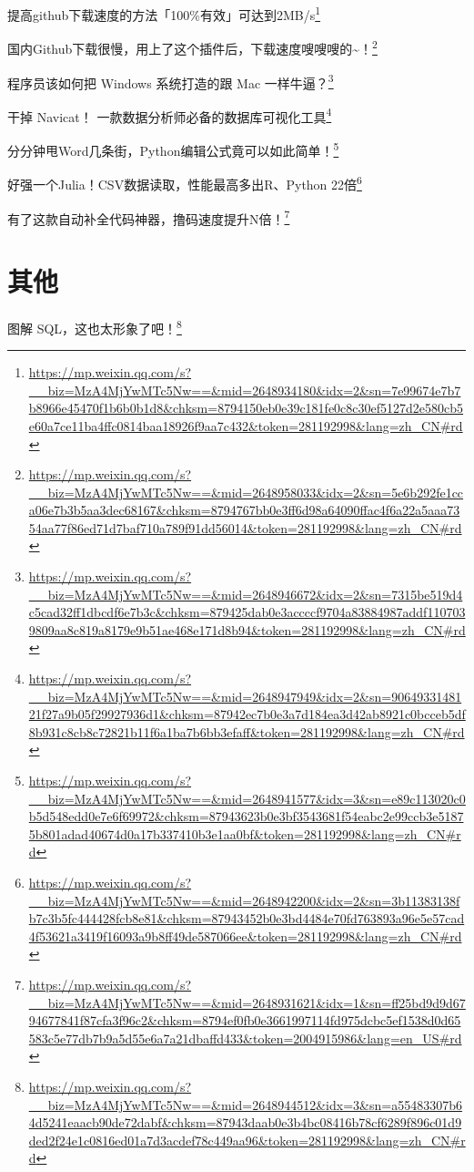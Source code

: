 \documentclass[]{ctexbook}
\renewcommand{\href}[2]{#2\footnote{\url{#1}}}
\begin{document}
\href{https://mp.weixin.qq.com/s?__biz=MzA4MjYwMTc5Nw==\&mid=2648934180\&idx=2\&sn=7e99674e7b7b8966e45470f1b6b0b1d8\&chksm=8794150eb0e39c181fe0c8c30ef5127d2e580cb5e60a7ce11ba4ffc0814baa18926f9aa7c432\&token=281192998\&lang=zh_CN\#rd}{提高github下载速度的方法「100\%有效」可达到2MB/s}

\href{https://mp.weixin.qq.com/s?__biz=MzA4MjYwMTc5Nw==\&mid=2648958033\&idx=2\&sn=5e6b292fe1cca06e7b3b5aa3dec68167\&chksm=8794767bb0e3ff6d98a64090ffac4f6a22a5aaa7354aa77f86ed71d7baf710a789f91dd56014\&token=281192998\&lang=zh_CN\#rd}{国内Github下载很慢，用上了这个插件后，下载速度嗖嗖嗖的\textasciitilde{}！}

\href{https://mp.weixin.qq.com/s?__biz=MzA4MjYwMTc5Nw==\&mid=2648946672\&idx=2\&sn=7315be519d4c5cad32ff1dbcdf6e7b3c\&chksm=879425dab0e3accccf9704a83884987addf1107039809aa8c819a8179e9b51ae468e171d8b94\&token=281192998\&lang=zh_CN\#rd}{程序员该如何把 Windows 系统打造的跟 Mac 一样牛逼？}

\href{https://mp.weixin.qq.com/s?__biz=MzA4MjYwMTc5Nw==\&mid=2648947949\&idx=2\&sn=9064933148121f27a9b05f29927936d1\&chksm=87942ec7b0e3a7d184ea3d42ab8921c0bcceb5df8b931c8cb8c72821b11f6a1ba7b6bb3efaff\&token=281192998\&lang=zh_CN\#rd}{干掉 Navicat！ 一款数据分析师必备的数据库可视化工具}

\href{https://mp.weixin.qq.com/s?__biz=MzA4MjYwMTc5Nw==\&mid=2648941577\&idx=3\&sn=e89c113020c0b5d548edd0e7e6f69972\&chksm=87943623b0e3bf3543681f54eabc2e99ccb3e51875b801adad40674d0a17b337410b3e1aa0bf\&token=281192998\&lang=zh_CN\#rd}{分分钟甩Word几条街，Python编辑公式竟可以如此简单！}

\href{https://mp.weixin.qq.com/s?__biz=MzA4MjYwMTc5Nw==\&mid=2648942200\&idx=2\&sn=3b11383138fb7c3b5fc444428fcb8e81\&chksm=87943452b0e3bd4484e70fd763893a96e5e57cad4f53621a3419f16093a9b8ff49de587066ee\&token=281192998\&lang=zh_CN\#rd}{好强一个Julia！CSV数据读取，性能最高多出R、Python 22倍}

\href{https://mp.weixin.qq.com/s?__biz=MzA4MjYwMTc5Nw==\&mid=2648931621\&idx=1\&sn=ff25bd9d9d6794677841f87cfa3f96c2\&chksm=8794ef0fb0e3661997114fd975dcbc5ef1538d0d65583c5e77db7b9a5d55e6a7a21dbaffd433\&token=2004915986\&lang=en_US\#rd}{有了这款自动补全代码神器，撸码速度提升N倍！}

\hypertarget{ux5176ux4ed6-6}{%
\section{其他}\label{ux5176ux4ed6-6}}

\href{https://mp.weixin.qq.com/s?__biz=MzA4MjYwMTc5Nw==\&mid=2648944512\&idx=3\&sn=a55483307b64d5241eaacb90de72dabf\&chksm=87943daab0e3b4bc08416b78cf6289f896c01d9ded2f24e1c0816ed01a7d3acdef78c449aa96\&token=281192998\&lang=zh_CN\#rd}{图解 SQL，这也太形象了吧！}
\end{document}
